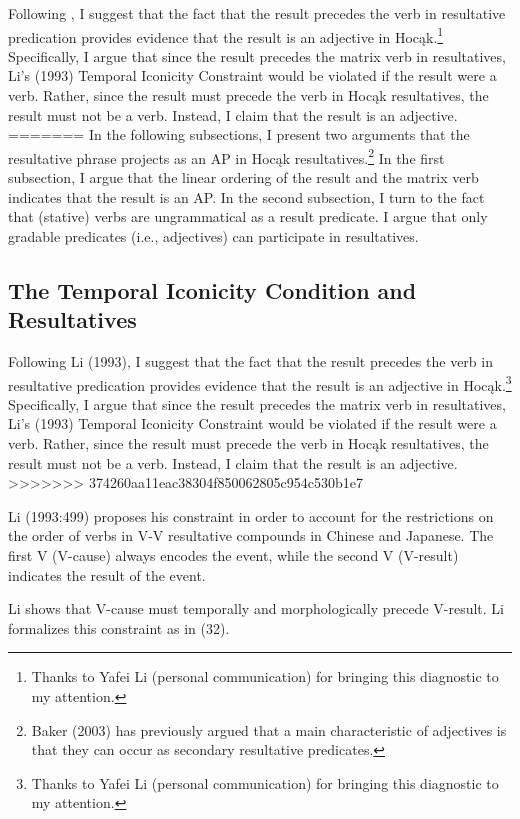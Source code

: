 \documentclass[output=paper]{LSP/langsci}
\begin{document}
\begin{exe}
\begin{exe}
\begin{exe}
\begin{exe}
{\begin{exe}
Following \citet{Li1993}, I suggest that the fact that the result precedes the verb in resultative predication provides evidence that the result is an adjective in Hocąk.\footnote{Thanks to Yafei Li (personal communication) for bringing this diagnostic to my attention.} Specifically, I argue that since the result precedes the matrix verb in resultatives, Li's (1993) Temporal Iconicity Constraint would be violated if the result were a verb. Rather, since the result must precede the verb in Hocąk resultatives, the result must not be a verb. Instead, I claim that the result is an adjective.
=======
In the following subsections, I present two arguments that the resultative phrase projects as an AP in Hoc\k{a}k resultatives.\footnote{Baker (2003) has previously argued that a main characteristic of adjectives is that they can occur as secondary resultative predicates.} In the first subsection, I argue that the linear ordering of the result and the matrix verb indicates that the result is an AP. In the second subsection, I turn to the fact that (stative) verbs are ungrammatical as a result predicate. I argue that only gradable predicates (i.e., adjectives) can participate in resultatives. 

\subsection{The Temporal Iconicity Condition and Resultatives}

Following Li (1993), I suggest that the fact that the result precedes the verb in resultative predication provides evidence that the result is an adjective in Hoc\k{a}k.\footnote{Thanks to Yafei Li (personal communication) for bringing this diagnostic to my attention.} Specifically, I argue that since the result precedes the matrix verb in resultatives, Li's (1993) Temporal Iconicity Constraint would be violated if the result were a verb. Rather, since the result must precede the verb in Hoc\k{a}k resultatives, the result must not be a verb. Instead, I claim that the result is an adjective.
>>>>>>> 374260aa11eac38304f850062805c954c530b1e7

Li (1993:499) proposes his constraint in order to account for the restrictions on the order of verbs in V-V resultative compounds in Chinese and Japanese. The first V (V-cause) always encodes the event, while the second V (V-result) indicates the result of the event. 

Li shows that V-cause must temporally and morphologically precede V-result. Li formalizes this constraint as in (32).


\end{exe}}
\end{exe}
\end{exe}
\end{exe}
\end{exe}
\end{document}
